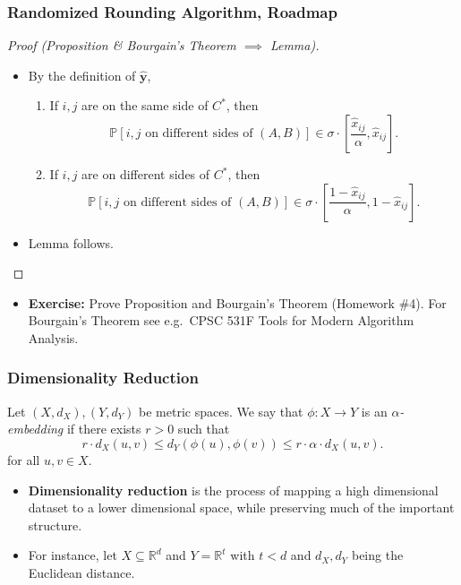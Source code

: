 \documentclass{beamer}
\newcommand{\RR}{\mathbb{R}}
\newcommand{\PP}{\mathbb{P}}
\begin{document}
    \begin{frame}
        \frametitle{Randomized Rounding Algorithm, Roadmap}
    
        \begin{proof}[Proof (Proposition \& Bourgain's Theorem $\implies$ Lemma)]
            \begin{itemize}
                \item By the definition of $\mathbf{\hat y}$,
                \begin{enumerate}
                    \item If $i, j$ are on the same side of $C^*$, then
                    $$ \PP[\text{$i, j$ on different sides of $(A, B)$}] \in \sigma \cdot \left[\frac{\hat x_{ij}}{\alpha}, \hat x_{ij}\right]. $$
                    \item If $i, j$ are on different sides of $C^*$, then
                    $$ \PP[\text{$i, j$ on different sides of $(A, B)$}] \in \sigma \cdot \left[\frac{1 - \hat x_{ij}}{\alpha}, 1 - \hat x_{ij}\right]. $$
                \end{enumerate}
                \pause
                \item Lemma follows.
            \end{itemize}
        \end{proof}

        \pause

        \begin{itemize}
            \item {\bf Exercise:} Prove Proposition and Bourgain's Theorem (Homework \#4). For Bourgain's Theorem see e.g.\ CPSC 531F Tools for Modern Algorithm Analysis.
        \end{itemize}
    \end{frame}

    \begin{frame}
        \frametitle{Dimensionality Reduction}

        \begin{definition}
            Let $(X, d_X), (Y, d_Y)$ be metric spaces. We say that $\phi : X \to Y$ is an \emph{$\alpha$-embedding} if there exists $r > 0$ such that
            $$ r \cdot d_X(u, v) \leq d_Y(\phi(u), \phi(v)) \leq r \cdot \alpha \cdot d_X(u, v). $$
            for all $u, v \in X$.
        \end{definition}

        \pause

        \begin{itemize}
            \item {\bf Dimensionality reduction} is the process of mapping a high dimensional dataset to a lower dimensional space, while preserving much of the important structure. \pause
            \item For instance, let $X \subseteq \RR^d$ and $Y = \RR^t$ with $t < d$ and $d_X, d_Y$ being the Euclidean distance.
        \end{itemize}
    \end{frame}
\end{document}

